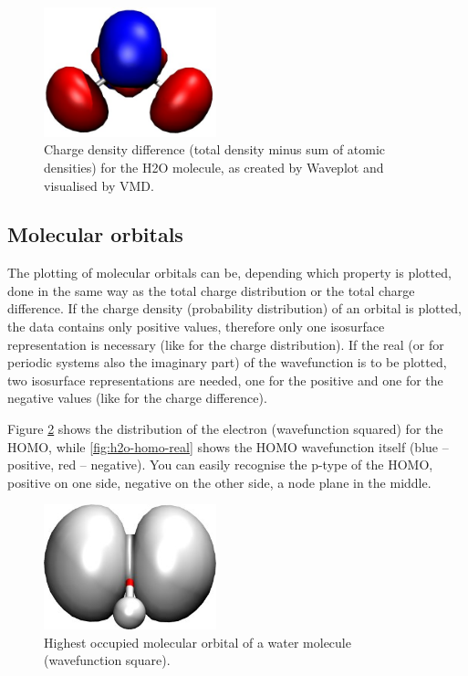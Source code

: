 \begin{figure}
  \centering
  \includegraphics[width=5cm]{figures/h2o-densitydiff.jpg}
  \caption{Charge density difference (total density minus sum of atomic densities) for the H2O molecule, as created by Waveplot and visualised by VMD.}
  \label{fig:h2o-densitydiff}
\end{figure}


\subsection{Molecular orbitals}

The plotting of molecular orbitals can be, depending which property is plotted,
done in the same way as the total charge distribution or the total charge
difference. If the charge density (probability distribution) of an orbital is
plotted, the data contains only positive values, therefore only one isosurface
representation is necessary (like for the charge distribution). If the real (or
for periodic systems also the imaginary part) of the wavefunction is to be
plotted, two isosurface representations are needed, one for the positive and one
for the negative values (like for the charge difference).

Figure \ref{fig:h2o-homo-abs2} shows the distribution of the electron
(wavefunction squared) for the HOMO, while \ref{fig:h2o-homo-real} shows the
HOMO wavefunction itself (blue -- positive, red -- negative). You can easily
recognise the p-type of the HOMO, positive on one side, negative on the other
side, a node plane in the middle.

\begin{figure}
  \centering
  \includegraphics[width=5cm]{figures/h2o-homo-abs2.jpg}
  \caption{Highest occupied molecular orbital of a water molecule (wavefunction square).}
  \label{fig:h2o-homo-abs2}
\end{figure}

